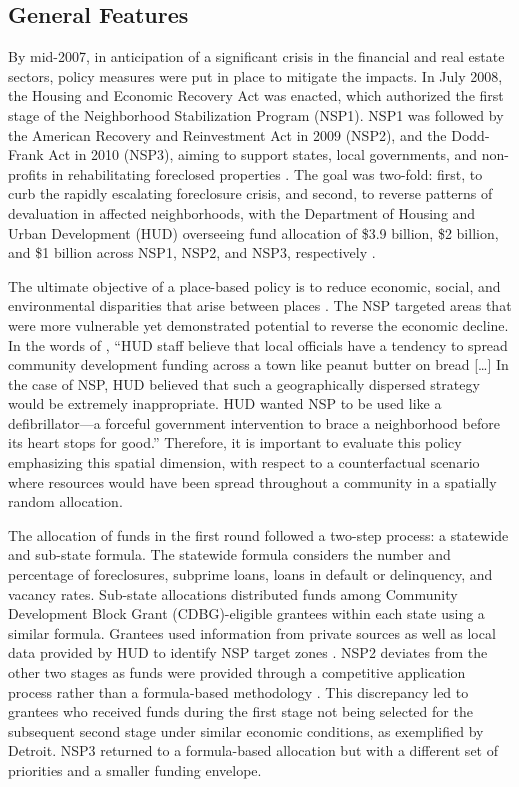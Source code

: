 \documentclass[12pt,authoryear]{elsarticle}
\begin{document}
\subsection{General Features}

By mid-2007, in anticipation of a significant crisis in the financial and real estate sectors, policy measures were put in place to mitigate the impacts. In July 2008, the Housing and Economic Recovery Act was enacted, which authorized the first stage of the Neighborhood Stabilization Program (NSP1). NSP1 was followed by the American Recovery and Reinvestment Act in 2009 (NSP2), and the Dodd-Frank Act in 2010 (NSP3), aiming to support states, local governments, and non-profits in rehabilitating foreclosed properties \citep{immergluck2013}. The goal was two-fold: first, to curb the rapidly escalating foreclosure crisis, and second, to reverse patterns of devaluation in affected neighborhoods, with the Department of Housing and Urban Development (HUD) overseeing fund allocation of \$3.9 billion, \$2 billion, and \$1 billion across NSP1, NSP2, and NSP3, respectively \citep{fraser2015}.

The ultimate objective of a place-based policy is to reduce economic, social, and environmental disparities that arise between places \citep{fainstein1993}. The NSP targeted areas that were more vulnerable yet demonstrated potential to reverse the economic decline. In the words of \citet[p.~139]{joice2011}, ``HUD staff believe that local officials have a tendency to spread community development funding across a town like peanut butter on bread [\ldots] In the case of NSP, HUD believed that such a geographically dispersed strategy would be extremely inappropriate. HUD wanted NSP to be used like a defibrillator---a forceful government intervention to brace a neighborhood before its heart stops for good.'' Therefore, it is important to evaluate this policy emphasizing this spatial dimension, with respect to a counterfactual scenario where resources would have been spread throughout a community in a spatially random allocation.

The allocation of funds in the first round followed a two-step process: a statewide and sub-state formula. The statewide formula considers the number and percentage of foreclosures, subprime loans, loans in default or delinquency, and vacancy rates. Sub-state allocations distributed funds among Community Development Block Grant (CDBG)-eligible grantees within each state using a similar formula. Grantees used information from private sources as well as local data provided by HUD to identify NSP target zones \citep{hud2008}. NSP2 deviates from the other two stages as funds were provided through a competitive application process rather than a formula-based methodology \citep{spader2015}. This discrepancy led to grantees who received funds during the first stage not being selected for the subsequent second stage under similar economic conditions, as exemplified by Detroit. NSP3 returned to a formula-based allocation but with a different set of priorities and a smaller funding envelope.
\end{document}
